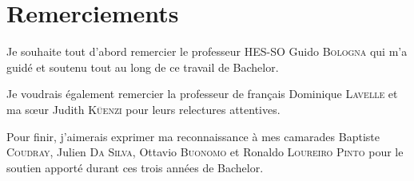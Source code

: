 \chapter*{Remerciements} %

Je souhaite tout d'abord remercier le professeur HES-SO Guido \textsc{Bologna} qui m'a guidé et soutenu tout au long de ce travail de Bachelor.

Je voudrais également remercier la professeur de français Dominique \textsc{Lavelle} et ma sœur Judith \textsc{Küenzi} pour leurs relectures attentives.

Pour finir, j'aimerais exprimer ma reconnaissance à mes camarades Baptiste \textsc{Coudray}, Julien \textsc{Da Silva}, Ottavio \textsc{Buonomo} et Ronaldo \textsc{Loureiro Pinto} pour le soutien apporté durant ces trois années de Bachelor.
